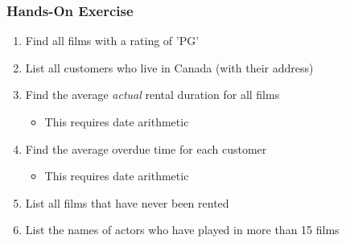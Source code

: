 \begin{tcolorbox}[colback=code]
\subsubsection*{Hands-On Exercise}

\begin{enumerate}
  \item Find all films with a rating of 'PG'
  \item List all customers who live in Canada (with their address)
  \item Find the average \emph{actual} rental duration for all films
  \begin{itemize}
     \item This requires date arithmetic
  \end{itemize}
  \item Find the average overdue time for each customer
  \begin{itemize}
     \item This requires date arithmetic
  \end{itemize}
  \item List all films that have never been rented
  \item List the names of actors who have played in more than 15 films
\end{enumerate}
\end{tcolorbox}

